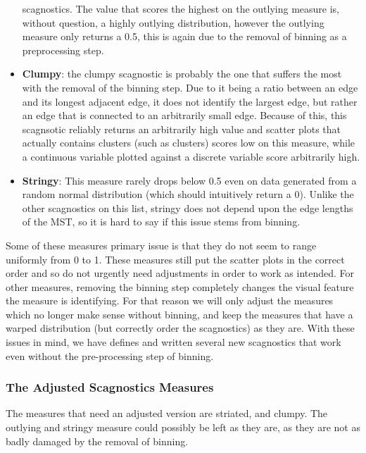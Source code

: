 \begin{itemize}
  scagnostics. The value that scores the highest on the outlying measure
  is, without question, a highly outlying distribution, however the
  outlying measure only returns a 0.5, this is again due to the removal
  of binning as a preprocessing step.
\item
  \textbf{Clumpy}: the clumpy scagnostic is probably the one that
  suffers the most with the removal of the binning step. Due to it being
  a ratio between an edge and its longest adjacent edge, it does not
  identify the largest edge, but rather an edge that is connected to an
  arbitrarily small edge. Because of this, this scagnsotic reliably
  returns an arbitrarily high value and scatter plots that actually
  contains clusters (such as clusters) scores low on this measure, while
  a continuous variable plotted against a discrete variable score
  arbitrarily high.
\item
  \textbf{Stringy}: This measure rarely drops below 0.5 even on data
  generated from a random normal distribution (which should intuitively
  return a 0). Unlike the other scagnostics on this list, stringy does
  not depend upon the edge lengths of the MST, so it is hard to say if
  this issue stems from binning.
\end{itemize}

Some of these measures primary issue is that they do not seem to range
uniformly from 0 to 1. These measures still put the scatter plots in the
correct order and so do not urgently need adjustments in order to work
as intended. For other measures, removing the binning step completely
changes the visual feature the measure is identifying. For that reason
we will only adjust the measures which no longer make sense without
binning, and keep the measures that have a warped distribution (but
correctly order the scagnostics) as they are. With these issues in mind,
we have defines and written several new scagnostics that work even
without the pre-processing step of binning.

\hypertarget{the-adjusted-scagnostics-measures}{%
\subsubsection{The Adjusted Scagnostics
Measures}\label{the-adjusted-scagnostics-measures}}

The measures that need an adjusted version are striated, and clumpy. The
outlying and stringy measure could possibly be left as they are, as they
are not as badly damaged by the removal of binning.

